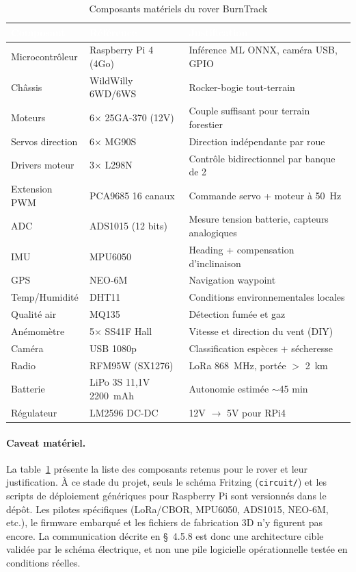 \documentclass[a4paper,12pt,openany,titlepage]{scrartcl}
\begin{document}
\begin{table}[H]
\centering
\caption{Composants matériels du rover BurnTrack}
\label{tab:bom}
\begin{tabularx}{\textwidth}{|l|l|X|}
\hline
\rowcolor{NavyBlue} \textcolor{white}{\textbf{Composant}} & \textcolor{white}{\textbf{Référence}} & \textcolor{white}{\textbf{Justification}} \\
\hline
Microcontrôleur & Raspberry Pi 4 (4Go) & Inférence ML ONNX, caméra USB, GPIO \\
\hline
Châssis & WildWilly 6WD/6WS & Rocker-bogie tout-terrain \\
\hline
Moteurs & 6$\times$ 25GA-370 (12V) & Couple suffisant pour terrain forestier \\
\hline
Servos direction & 6$\times$ MG90S & Direction indépendante par roue \\
\hline
Drivers moteur & 3$\times$ L298N & Contrôle bidirectionnel par banque de 2 \\
\hline
Extension PWM & PCA9685 16 canaux & Commande servo + moteur à 50~Hz \\
\hline
ADC & ADS1015 (12 bits) & Mesure tension batterie, capteurs analogiques \\
\hline
IMU & MPU6050 & Heading + compensation d'inclinaison \\
\hline
GPS & NEO-6M & Navigation waypoint \\
\hline
Temp/Humidité & DHT11 & Conditions environnementales locales \\
\hline
Qualité air & MQ135 & Détection fumée et gaz \\
\hline
Anémomètre & 5$\times$ SS41F Hall & Vitesse et direction du vent (DIY) \\
\hline
Caméra & USB 1080p & Classification espèces + sécheresse \\
\hline
Radio & RFM95W (SX1276) & LoRa 868~MHz, portée $>$ 2~km \\
\hline
Batterie & LiPo 3S 11,1V 2200~mAh & Autonomie estimée $\sim$45 min \\
\hline
Régulateur & LM2596 DC-DC & 12V $\rightarrow$ 5V pour RPi4 \\
\hline
\end{tabularx}
\end{table}

\paragraph{Caveat matériel.} La table~\ref{tab:bom} présente la liste des composants retenus pour le rover et leur justification. À ce stade du projet, seuls le schéma Fritzing (\texttt{circuit/}) et les scripts de déploiement génériques pour Raspberry Pi sont versionnés dans le dépôt. Les pilotes spécifiques (LoRa/CBOR, MPU6050, ADS1015, NEO-6M, etc.), le firmware embarqué et les fichiers de fabrication 3D n'y figurent pas encore. La communication décrite en \S~4.5.8 est donc une architecture cible validée par le schéma électrique, et non une pile logicielle opérationnelle testée en conditions réelles.
\end{document}
